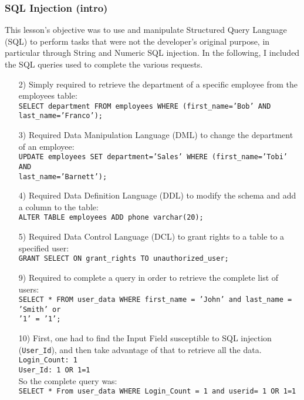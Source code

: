 \documentclass{article}
\begin{document}
\subsubsection{SQL Injection (intro)}
This lesson's objective was to use and manipulate Structured Query Language (SQL) to perform tasks that were not the developer's original purpose, in particular through String and Numeric SQL injection.
In the following, I included the SQL queries used to complete the various requests.
\begin{itemize}
    \item[2)] {Simply required to retrieve the department of a specific employee from the employees table:\\
    \texttt{SELECT department FROM employees WHERE (first\_name='Bob' AND last\_name='Franco');}}
    
    \item[3)] {Required Data Manipulation Language (DML) to change the department of an employee:\\
    \texttt{UPDATE employees SET department='Sales' WHERE (first\_name='Tobi' AND \\ last\_name='Barnett');}}
    
    \item[4)] {Required Data Definition Language (DDL) to modify the schema and add a column to the table:\\
    \texttt{ALTER TABLE employees ADD phone varchar(20);}}
    
    \item[5)] {Required Data Control Language (DCL) to grant rights to a table to a specified user:\\
    \texttt{GRANT SELECT ON grant\_rights TO unauthorized\_user;}}
    
    \item[9)] {Required to complete a query in order to retrieve the complete list of users:\\
    \texttt{SELECT * FROM user\_data WHERE first\_name = 'John' and last\_name = 'Smith' or \\'1' = '1';}}
    
    \item[10)] {First, one had to find the Input Field susceptible to SQL injection (\texttt{User\_Id}), and then take advantage of that to retrieve all the data.\\
    \texttt{Login\_Count: 1\\User\_Id: 1 OR 1=1}\\
    So the complete query was:\\
    \texttt{SELECT * From user\_data WHERE Login\_Count = 1 and userid= 1 OR 1=1}}
    

\end{itemize}
\end{document}
